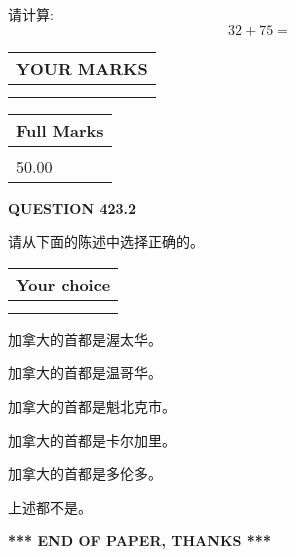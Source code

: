 \documentclass{ctexart}
\begin{document}
  
 
请计算:
\begin{equation}
32 +  %
75 = \nonumber
\end{equation}
 

 

 
  
\vspace{0.2in}
  
\noindent\begin{tabular}{|l|}
\hline
 YOUR MARKS  \\
\hline
 \\ 
 \\ 
\hline
\end{tabular}
\hspace{0.05in} \begin{tabular}{|l|}
\hline
 Full Marks  \\
\hline
 \\ 
50.00 \\
\hline
\end{tabular}
{\textbf{\Large{QUESTION
423.2 
}}}
  
  
请从下面的陈述中选择正确的。
  
  
\noindent\hspace{3.0in} \begin{tabular}{|l|}
\hline
Your choice \\
\hline
 \\ 
 \\ 
\hline
\end{tabular}
  
  
 
 
加拿大的首都是渥太华。
 
 
加拿大的首都是温哥华。
 
 
加拿大的首都是魁北克市。
 
 
加拿大的首都是卡尔加里。
 
 
加拿大的首都是多伦多。
 
 
 上述都不是。
 
 
   
   
 \vspace{0.2in}
 
   
   
   
   
\vspace{1.0in} 
{\textbf{\large{ *** END OF PAPER, THANKS *** }}} 
   
\end{document}
